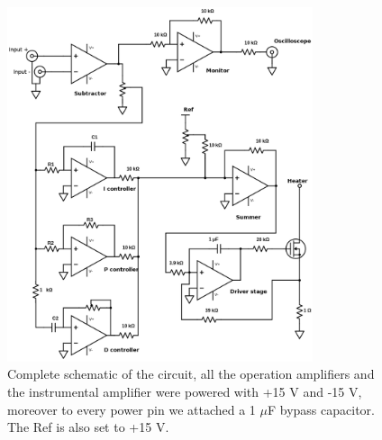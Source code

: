 \documentclass[a4paper,10pt]{article}
\begin{document}
\begin{figure}[H]
\centering
\includegraphics[width=0.8\textwidth]{circuit}
\caption{Complete schematic of the circuit, all the operation amplifiers and the instrumental amplifier were powered with +15 V and -15 V, moreover to every power pin we attached a 1 $\mu$F bypass capacitor. The Ref is also set to +15 V.}\label{circuit}
\end{figure}
\end{document}

